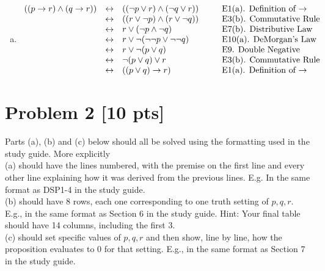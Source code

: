 \documentclass[12pt]{article}
\begin{document}
\begin{enumerate}[(a)]
		\item
			\[
				\begin{array}{lclcl}
					((p \rightarrow r) \wedge (q \rightarrow r)) & \leftrightarrow & ((\neg p \vee r) \wedge (\neg q \vee r)) & \hspace*{.1in} & \mbox{E1(a). Definition of $\rightarrow$} \\
					                                             & \leftrightarrow & ((r \vee \neg p) \wedge (r \vee \neg q)) &                & \mbox{E3(b). Commutative Rule}            \\
					                                             & \leftrightarrow & r \vee (\neg p \wedge \neg q)            &                & \mbox{E7(b). Distributive Law}            \\
					                                             & \leftrightarrow & r \vee \neg(\neg\neg p \vee \neg\neg q)  &                & \mbox{E10(a). DeMorgan's Law}             \\
					                                             & \leftrightarrow & r \vee \neg(p \vee q)                    &                & \mbox{E9. Double Negative}                \\
					                                             & \leftrightarrow & \neg(p \vee q) \vee r                    &                & \mbox{E3(b). Commutative Rule}            \\
					                                             & \leftrightarrow & ((p \vee q) \rightarrow r)               &                & \mbox{E1(a). Definition of $\rightarrow$}
				\end{array}
			\]
	\end{enumerate}

	\newpage
	\section*{\textbf{Problem 2} [10 pts]}
	Parts (a), (b) and (c) below should all be solved using the formatting used in
	the study guide. More explicitly\\
	(a) should have the lines numbered, with the premise on the first line and
	every other line explaining how it was derived from the previous lines. E.g.
	In the same format as DSP1-4 in the study guide. \\
	(b) should have 8 rows, each one corresponding to one truth setting of
	$p,q,r.$ E.g., in the same format as Section 6 in the study guide. Hint: Your
	final table should have 14 columns, including the first 3. \\
	(c) should set specific values of $p,q,r$ and then show, line by line, how the
	proposition evaluates to $0$ for that setting. E.g., in the same format as
	Section 7 in the study guide.
\end{document}
